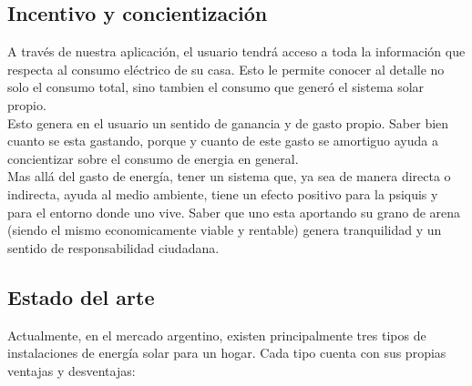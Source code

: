 \subsection{Incentivo y concientización}

A través de nuestra aplicación, el usuario tendrá acceso a toda la información que respecta al consumo eléctrico de su casa. Esto le permite conocer al detalle no solo el consumo total, sino tambien el consumo que generó el sistema solar propio.\\

Esto genera en el usuario un sentido de ganancia y de gasto propio. Saber bien cuanto se esta gastando, porque y cuanto de este gasto se amortiguo ayuda a concientizar sobre el consumo de energia en general. \\

Mas allá del gasto de energía, tener un sistema que, ya sea de manera directa o indirecta, ayuda al medio ambiente, tiene un efecto positivo para la psiquis y para el entorno donde uno vive. Saber que uno esta aportando su grano de arena (siendo el mismo economicamente viable y rentable) genera tranquilidad y un sentido de responsabilidad ciudadana. \\

\subsection{Estado del arte}

Actualmente, en el mercado argentino, existen principalmente tres tipos de instalaciones de energía solar para un hogar. Cada tipo cuenta con sus propias ventajas y desventajas:\\

